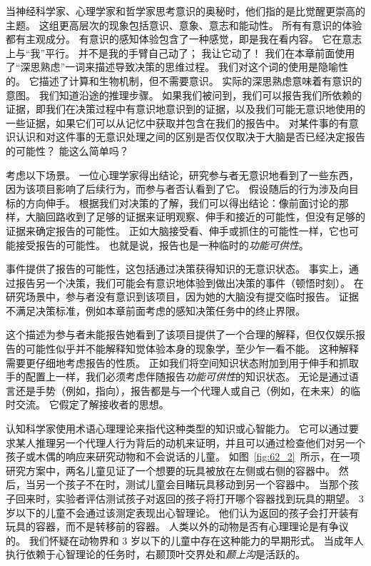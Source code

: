 当神经科学家、心理学家和哲学家思考意识的奥秘时，他们指的是比觉醒更崇高的主题。
这组更高层次的现象包括意识、意象、意志和能动性。
所有有意识的体验都有主观成分。
有意识的感知体验包含了一种感觉，即是我在看内容。
它在意志上与“我”平行。
并不是我的手臂自己动了；
我让它动了！
我们在本章前面使用了“深思熟虑”一词来描述导致决策的思维过程。
我们对这个词的使用是隐喻性的。
它描述了计算和生物机制，但不需要意识。
实际的深思熟虑意味着有意识的意图。
我们知道沿途的推理步骤。
如果我们被问到，我们可以报告我们所依赖的证据，即我们在决策过程中有意识地意识到的证据，以及我们可能无意识地使用的一些证据，如果它们可以从记忆中获取并包含在我们的报告中。
对某件事的有意识认识和对这件事的无意识处理之间的区别是否仅仅取决于大脑是否已经决定报告的可能性？
能这么简单吗？


考虑以下场景。
一位心理学家得出结论，研究参与者无意识地看到了一些东西，因为该项目影响了后续行为，而参与者否认看到了它。
假设随后的行为涉及向目标的方向伸手。
根据我们对决策的了解，我们可以得出结论：像前面讨论的那样，大脑回路收到了足够的证据来证明观察、伸手和接近的可能性，但没有足够的证据来确定报告的可能性。
正如大脑接受看、伸手或抓住的可能性一样，它也可能接受报告的可能性。
也就是说，报告也是一种临时的\textit{功能可供性}。


事件提供了报告的可能性，这包括通过决策获得知识的无意识状态。
事实上，通过报告另一个决策，我们可能会有意识地体验到做出决策的事件（顿悟时刻）。
在研究场景中，参与者没有意识到该项目，因为她的大脑没有提交临时报告。
证据不满足决策标准，例如本章前面考虑的感知决策任务中的终止界限。


这个描述为参与者未能报告她看到了该项目提供了一个合理的解释，但仅仅娱乐报告的可能性似乎并不能解释知觉体验本身的现象学，至少乍一看不能。
这种解释需要更仔细地考虑报告的性质。
正如我们将空间知识状态附加到用于伸手和抓取手的配置上一样，我们必须考虑伴随报告\textit{功能可供性}的知识状态。
无论是通过语言还是手势（例如，指向），报告都是与一个代理人或自己（例如，在未来）的临时交流。
它假定了解接收者的思想。


认知科学家使用术语心理理论来指代这种类型的知识或心智能力。
它可以通过要求某人推理另一个代理人行为背后的动机来证明，并且可以通过检查他们对另一个孩子或木偶的响应来研究动物和不会说话的儿童。
如图~\ref{fig:62_2}~所示，在一项研究方案中，两名儿童见证了一个想要的玩具被放在左侧或右侧的容器中。
然后，当另一个孩子不在时，测试儿童会目睹玩具移动到另一个容器中。
当那个孩子回来时，实验者评估测试孩子对返回的孩子将打开哪个容器找到玩具的期望。
3 岁以下的儿童不会通过该测定表现出心智理论。
他们认为返回的孩子会打开装有玩具的容器，而不是转移前的容器。
人类以外的动物是否有心理理论是有争议的。
我们怀疑在动物界和 3 岁以下的儿童中存在这种能力的早期形式。
当成年人执行依赖于心智理论的任务时，右颞顶叶交界处和\textit{颞上沟}是活跃的。



